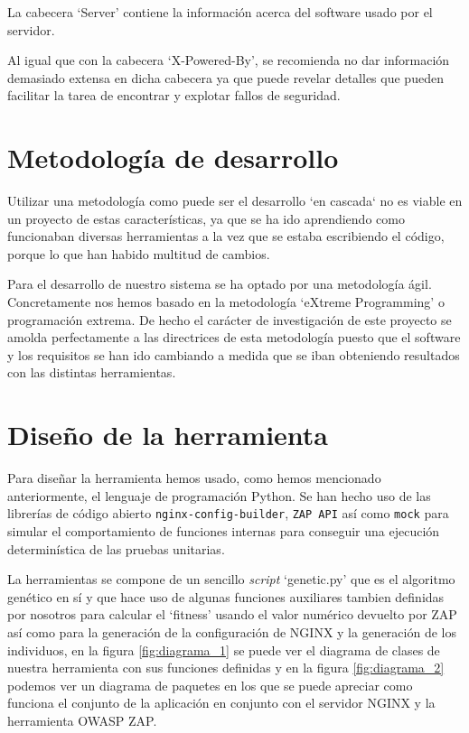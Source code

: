 La cabecera `Server' contiene la información acerca del software usado por el servidor.

\bigskip
Al igual que con la cabecera `X-Powered-By', se recomienda no dar información demasiado extensa en dicha cabecera ya que puede revelar detalles que pueden facilitar la tarea de encontrar y explotar fallos de seguridad.

\section{Metodología de desarrollo}

Utilizar una metodología como puede ser el desarrollo `en cascada` no es viable en un proyecto de estas características, ya que se ha ido aprendiendo como funcionaban diversas herramientas a la vez que se estaba escribiendo el código, porque lo que han habido multitud de cambios.

\bigskip
Para el desarrollo de nuestro sistema se ha optado por una metodología ágil. Concretamente nos hemos basado en la metodología `eXtreme Programming' o programación extrema. De hecho el carácter de investigación de este proyecto se amolda perfectamente a las directrices de esta metodología puesto que el software y los requisitos se han ido cambiando a medida que se iban obteniendo resultados con las distintas herramientas. 

\section{Diseño de la herramienta}

Para diseñar la herramienta hemos usado, como hemos mencionado anteriormente, el lenguaje de programación Python. Se han hecho uso de las librerías de código abierto \texttt{nginx-config-builder}, \texttt{ZAP API} así como \texttt{mock} para simular el comportamiento de funciones internas para conseguir una ejecución determinística de las pruebas unitarias.

\bigskip
La herramientas se compone de un sencillo \textit{script} `genetic.py' que es el algoritmo genético en sí y que hace uso de algunas funciones auxiliares tambien definidas por nosotros para calcular el `fitness' usando el valor numérico devuelto por ZAP así como para la generación de la configuración de NGINX y la generación de los individuos, en la figura \ref{fig:diagrama_1} se puede ver el diagrama de clases de nuestra herramienta con sus funciones definidas y en la figura \ref{fig:diagrama_2} podemos ver un diagrama de paquetes en los que se puede apreciar como funciona el conjunto de la aplicación en conjunto con el servidor NGINX y la herramienta OWASP ZAP.

